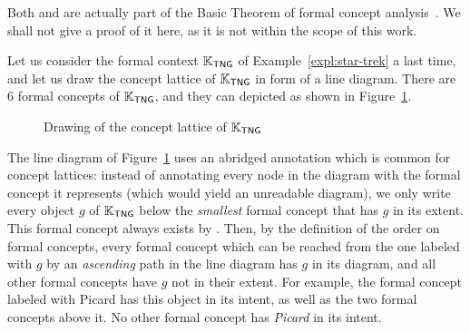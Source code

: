 Both  and
 are actually part of the Basic Theorem
of formal concept analysis~\cite[Theorem ??]{fca-book}.  We shall not
give a proof of it here, as it is not within the scope of this work.

\begin{Example}
  \label{expl:star-trek-concept-lattice}
  Let us consider the formal context ${\mathbb{K}}_{\mathsf{TNG}}$ of
  Example~\ref{expl:star-trek} a last time, and let us draw the concept lattice of ${\mathbb{K}}_{\mathsf{TNG}}$ in form of a line diagram.  There are 6 formal concepts of ${\mathbb{K}}_{\mathsf{TNG}}$, and they can depicted as shown in
  Figure~\ref{fig:star-trek-concept-lattice}.

  \begin{figure}[tp]
    \centering
    \caption{Drawing of the concept lattice of ${\mathbb{K}}_{\mathsf{TNG}}$}
    \label{fig:star-trek-concept-lattice}
  \end{figure}

  The line diagram of Figure~\ref{fig:star-trek-concept-lattice} uses an abridged
  annotation which is common for concept lattices: instead of annotating every node in the
  diagram with the formal concept it represents (which would yield an unreadable diagram),
  we only write every object $g$ of ${\mathbb{K}}_{\mathsf{TNG}}$ below the \emph{smallest}
  formal concept that has $g$ in its extent.  This formal concept always exists by
  .  Then, by the definition of the
  order on formal concepts, every formal concept which can be reached from the one labeled
  with $g$ by an \emph{ascending} path in the line diagram has $g$ in its diagram, and all
  other formal concepts have $g$ not in their extent.  For example, the formal concept
  labeled with \textsf{Picard} has this object in its intent, as well as the two formal
  concepts above it.  No other formal concept has \emph{Picard} in its intent.


\end{Example}
